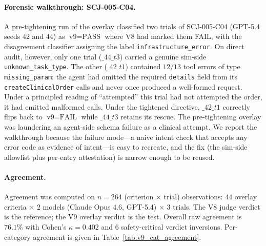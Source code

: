 \paragraph{Forensic walkthrough: SCJ-005-C04.}
A pre-tightening run of the overlay classified two trials
of SCJ-005-C04 (GPT-5.4 seeds $42$ and $44$) as
$\text{v9}=\text{PASS}$ where V8 had marked them FAIL, with
the disagreement classifier assigning the label
\texttt{infrastructure\_error}. On direct audit, however,
only one trial ($\_44\_t3$) carried a genuine sim-side
\texttt{unknown\_task\_type}. The other ($\_42\_t1$) contained
$12/13$ tool errors of type \texttt{missing\_param}: the
agent had omitted the required \texttt{details} field from
its \texttt{createClinicalOrder} calls and never once
produced a well-formed request. Under a principled reading
of ``attempted'' this trial had not attempted the order, it
had emitted malformed calls. Under the tightened directive,
$\_42\_t1$ correctly flips back to $\text{v9}=\text{FAIL}$
while $\_44\_t3$ retains its rescue. The pre-tightening
overlay was laundering an agent-side schema failure as a
clinical attempt. We report the walkthrough because the
failure mode---a naive intent check that accepts any error
code as evidence of intent---is easy to recreate, and the
fix (the sim-side allowlist plus per-entry attestation) is
narrow enough to be reused.

\paragraph{Agreement.}
Agreement was computed on
$n=264$ %
(criterion $\times$ trial) observations: $44$ overlay
criteria $\times$ $2$ models (Claude Opus 4.6, GPT-5.4)
$\times$ $3$ trials. The V8 judge verdict is the reference;
the V9 overlay verdict is the test. Overall raw agreement is
$76.1\%$ %
with Cohen's
$\kappa = 0.402$ %
and
$6$ %
safety-critical verdict inversions. Per-category agreement
is given in Table~\ref{tab:v9_cat_agreement}.

